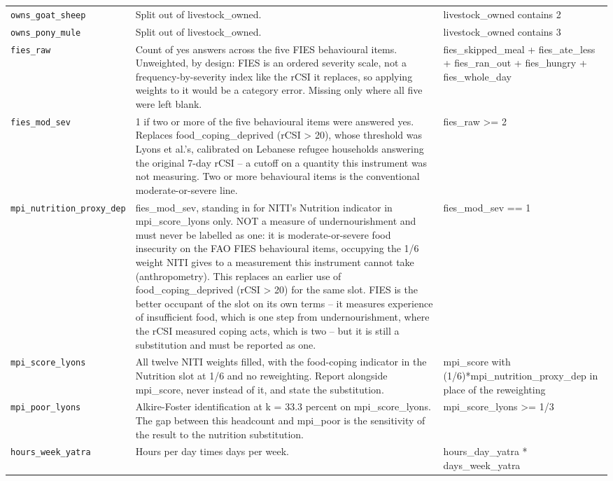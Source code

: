 \documentclass[10pt]{article}
\begin{document}
{\begin{longtable}{p{3.3cm}p{7.6cm}p{5.7cm}}
\texttt{owns\_goat\_sheep} & Split out of livestock\_owned. & livestock\_owned contains 2 \\
\texttt{owns\_pony\_mule} & Split out of livestock\_owned. & livestock\_owned contains 3 \\
\texttt{fies\_raw} & Count of yes answers across the five FIES behavioural items. Unweighted, by design: FIES is an ordered severity scale, not a frequency-by-severity index like the rCSI it replaces, so applying weights to it would be a category error. Missing only where all five were left blank. & fies\_skipped\_meal + fies\_ate\_less + fies\_ran\_out + fies\_hungry + fies\_whole\_day \\
\texttt{fies\_mod\_sev} & 1 if two or more of the five behavioural items were answered yes. Replaces food\_coping\_deprived (rCSI > 20), whose threshold was Lyons et al.'s, calibrated on Lebanese refugee households answering the original 7-day rCSI -- a cutoff on a quantity this instrument was not measuring. Two or more behavioural items is the conventional moderate-or-severe line. & fies\_raw >= 2 \\
\texttt{mpi\_nutrition\_proxy\_dep} & fies\_mod\_sev, standing in for NITI's Nutrition indicator in mpi\_score\_lyons only. NOT a measure of undernourishment and must never be labelled as one: it is moderate-or-severe food insecurity on the FAO FIES behavioural items, occupying the 1/6 weight NITI gives to a measurement this instrument cannot take (anthropometry). This replaces an earlier use of food\_coping\_deprived (rCSI > 20) for the same slot. FIES is the better occupant of the slot on its own terms -- it measures experience of insufficient food, which is one step from undernourishment, where the rCSI measured coping acts, which is two -- but it is still a substitution and must be reported as one. & fies\_mod\_sev == 1 \\
\texttt{mpi\_score\_lyons} & All twelve NITI weights filled, with the food-coping indicator in the Nutrition slot at 1/6 and no reweighting. Report alongside mpi\_score, never instead of it, and state the substitution. & mpi\_score with (1/6)*mpi\_nutrition\_proxy\_dep in place of the reweighting \\
\texttt{mpi\_poor\_lyons} & Alkire-Foster identification at k = 33.3 percent on mpi\_score\_lyons. The gap between this headcount and mpi\_poor is the sensitivity of the result to the nutrition substitution. & mpi\_score\_lyons >= 1/3 \\
\texttt{hours\_week\_yatra} & Hours per day times days per week. & hours\_day\_yatra * days\_week\_yatra \\

\end{longtable}}
\end{document}
